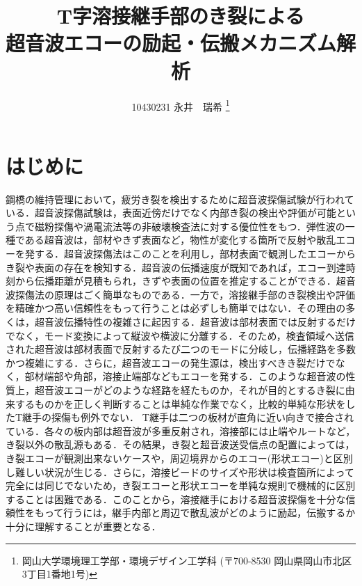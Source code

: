 \documentclass{jsce}
\title{
T字溶接継手部のき裂による\\
超音波エコーの励起・伝搬メカニズム解析
}%
\author{
 10430231  永井　瑞希
\thanks{岡山大学環境理工学部・環境デザイン工学科 (〒700-8530 岡山県岡山市北区3丁目1番地1号)}
}
\begin{document}
\maketitle
\section{はじめに}
鋼橋の維持管理において，疲労き裂を検出するために超音波探傷試験が行われている．超音波探傷試験は，表面近傍だけでなく内部き裂の検出や評価が可能という点で磁粉探傷や渦電流法等の非破壊検査法に対する優位性をもつ．弾性波の一種である超音波は，部材やきず表面など，物性が変化する箇所で反射や散乱エコーを発する．超音波探傷法はこのことを利用し，部材表面で観測したエコーからき裂や表面の存在を検知する．超音波の伝播速度が既知であれば，エコー到達時刻から伝播距離が見積もられ，きずや表面の位置を推定することができる．超音波探傷法の原理はごく簡単なものである．一方で，溶接継手部のき裂検出や評価を精確かつ高い信頼性をもって行うことは必ずしも簡単ではない．その理由の多くは，超音波伝播特性の複雑さに起因する．超音波は部材表面では反射するだけでなく，モード変換によって縦波や横波に分離する．そのため，検査領域へ送信された超音波は部材表面で反射するたび二つのモードに分岐し，伝播経路を多数かつ複雑にする．さらに，超音波エコーの発生源は，検出すべきき裂だけでなく，部材端部や角部，溶接止端部などもエコーを発する．このような超音波の性質上，超音波エコーがどのような経路を経たものか，それが目的とするき裂に由来するものかを正しく判断することは単純な作業でなく，比較的単純な形状をしたT継手の探傷も例外でない．
T継手は二つの板材が直角に近い向きで接合されている．各々の板内部は超音波が多重反射され，溶接部には止端やルートなど，き裂以外の散乱源もある．その結果，き裂と超音波送受信点の配置によっては，き裂エコーが観測出来ないケースや，周辺境界からのエコー(形状エコー)と区別し難しい状況が生じる．さらに，溶接ビードのサイズや形状は検査箇所によって完全には同じでないため，き裂エコーと形状エコーを単純な規則で機械的に区別することは困難である．このことから，溶接継手における超音波探傷を十分な信頼性をもって行うには，継手内部と周辺で散乱波がどのように励起，伝搬するか十分に理解することが重要となる．
\end{document}
